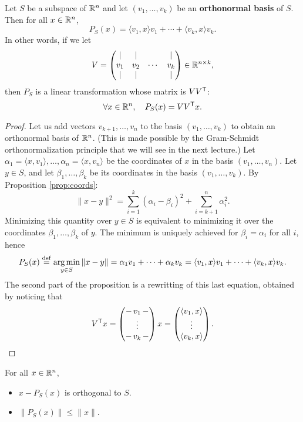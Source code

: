 \documentclass[11pt,nocut]{article}
\begin{document}
\begin{proposition}\label{prop:ortho}
	Let $S$ be a subspace of $\mathbb{R}^n$ and let $(v_1, \dots, v_k)$ be an \textbf{orthonormal basis} of $S$. Then for all $x \in \mathbb{R}^n$,
		$$P_S(x) = \langle v_1, x \rangle v_1 + \cdots + \langle v_k, x \rangle v_k.$$
		In other words, if we let
		$$
		V = 
\begin{pmatrix}
	| & | & & | \\
	v_1 & v_2 & \cdots& v_k \\
	| & | & & |
\end{pmatrix}
\in \mathbb{R}^{n \times k},
		$$
		then $P_S$ is a linear transformation whose matrix is $VV^{{\sf T}}$:
		$$
		\forall x \in \mathbb{R}^n, \quad P_S(x) = V V^{{\sf T}} x.
		$$
\end{proposition}
\begin{proof}
	Let us add vectors $v_{k+1}, \dots, v_n$ to the basis $(v_1, \dots, v_k)$ to obtain an orthonormal basis of $\mathbb{R}^n$. (This is made possible by the Gram-Schmidt orthonormalization principle that we will see in the next lecture.)
	Let $\alpha_1 = \langle x, v_1 \rangle, \dots, \alpha_n = \langle x , v_n \rangle$ be the coordinates of $x$ in the basis $(v_1, \dots, v_n)$.
	Let $y \in S$, and let $\beta_1, \dots, \beta_k$ be its coordinates in the basis $(v_1, \dots, v_k)$. By Proposition \ref{prop:coords}:
	$$
	\|x-y\|^2 = \sum_{i=1}^k (\alpha_i - \beta_i)^2 + \sum_{i=k+1}^n \alpha_i^2.
	$$
	Minimizing this quantity over $y \in S$ is equivalent to minimizing it over the coordinates $\beta_1, \dots, \beta_k$ of $y$. The minimum is uniquely achieved for $\beta_i = \alpha_i$ for all $i$, hence
	$$
	P_S(x) \overset{\rm def}{=} \operatorname*{arg\,min}_{y \in S} \|x - y\|
	= \alpha_1 v_1 + \dots + \alpha_k v_k
	= \langle v_1, x \rangle v_1 + \dots + \langle v_k, x \rangle v_k.
	$$
	The second part of the proposition is a rewritting of this last equation, obtained by noticing that
	$$
	V^{{\sf T}} x 
	= 
\begin{pmatrix}
	- \, v_1 \, -\\
	\vdots\\
	- \, v_k \,-
\end{pmatrix}
x
=
\begin{pmatrix}
	\langle v_1, x \rangle \\
	\vdots \\
	\langle v_k, x \rangle
\end{pmatrix}.
	$$
\end{proof}

\begin{corollary}\label{cor:projection}
	For all $x \in \mathbb{R}^n$,
	\begin{itemize}
		\item $x - P_S(x)$ is orthogonal to $S$.
		\item $\|P_S(x) \| \leq \|x\|$.
	\end{itemize}
\end{corollary}
\end{document}
